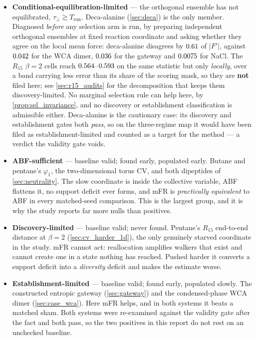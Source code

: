 \begin{itemize}
  \item \textbf{Conditional-equilibration-limited} --- the orthogonal ensemble has not
  equilibrated, $\tau_\perp \gtrsim T_{\mathrm{run}}$. Deca-alanine (\cref{sec:deca}) is the
  only member. Diagnosed \emph{before} any selection arm is run, by preparing
  independent orthogonal ensembles at fixed reaction coordinate and asking whether they agree
  on the local mean force: deca-alanine disagrees by $0.61$ of $|F'|$, against $0.042$ for
  the WCA dimer, $0.036$ for the gateway and $0.0075$ for NaCl. The $R_{15}$
  $\beta=2$ cells reach $0.564$--$0.593$ on the same statistic but only
  \emph{locally}, over a band carrying less error than its share of the scoring mask, so they
  are \textbf{not} filed here; see \cref{sec:r15_audits} for the decomposition that keeps them
  discovery-limited. No marginal selection rule can help here, by
  \cref{prop:sel_invariance}, and no discovery or establishment classification is admissible
  either. Deca-alanine is the cautionary case: its discovery and establishment gates both
  \emph{pass}, so on the three-regime map it would have been filed as establishment-limited
  and counted as a target for the method --- a verdict the validity gate voids.
  \item \textbf{ABF-sufficient} --- baseline valid; found early, populated early. Butane and
  pentane's $\varphi_1$, the two-dimensional torus CV, and both dipeptides of
  \cref{sec:neutrality}. The slow coordinate is inside the collective variable, ABF flattens
  it, no support deficit ever forms, and mFR is \emph{practically equivalent} to ABF in every
  matched-seed comparison. This is the largest group, and it is why the study reports far more
  nulls than positives.
  \item \textbf{Discovery-limited} --- baseline valid; never found. Pentane's $R_{15}$
  end-to-end distance at $\beta=2$ (\cref{sec:cv_harder_1d}), the only genuinely starved
  coordinate in the study. mFR cannot act: reallocation amplifies walkers that exist and
  cannot create one in a state nothing has reached. Pushed harder it converts a support
  deficit into a \emph{diversity} deficit and makes the estimate worse.
  \item \textbf{Establishment-limited} --- baseline valid; found early, populated slowly. The
  constructed entropic gateway (\cref{sec:gateway}) and the condensed-phase WCA dimer
  (\cref{sec:case_wca}). Here mFR helps, and in both systems it beats a matched sham. Both
  systems were re-examined against the validity gate after the fact and both pass, so the two
  positives in this report do not rest on an unchecked baseline.
\end{itemize}

